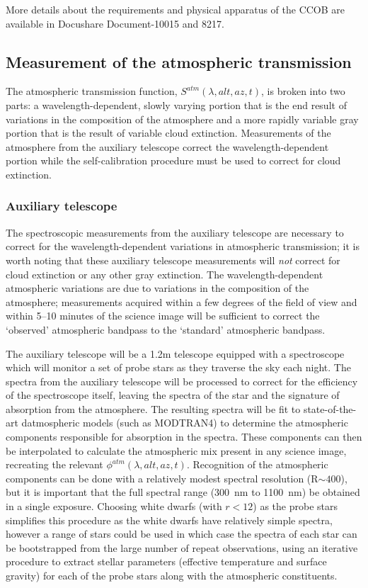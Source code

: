 \documentclass[12pt,preprint]{aastex}
\begin{document}
More details about the requirements and physical apparatus of the CCOB
are available in Docushare Document-10015 and 8217.

\subsection{Measurement of the atmospheric transmission} 

The atmospheric transmission function, $S^{atm}(\lambda,alt,az,t)$, is
broken into two parts: a wavelength-dependent, slowly varying portion
that is the end result of variations in the composition of the
atmosphere and a more rapidly variable gray portion that is the result
of variable cloud extinction. Measurements of the atmosphere from the
auxiliary telescope correct the wavelength-dependent portion while the
self-calibration procedure must be used to correct for cloud
extinction. 

\subsubsection{Auxiliary telescope}
\label{sec:auxtele}

The spectroscopic measurements from the auxiliary telescope are
necessary to correct for the wavelength-dependent variations in
atmospheric transmission; it is worth noting that these auxiliary
telescope measurements will {\it not} correct for cloud extinction or
any other gray extinction. The wavelength-dependent atmospheric
variations are due to variations in the composition of the atmosphere;
measurements acquired within a few degrees of the field of view and
within 5--10 minutes of the science image will be sufficient to
correct the `observed' atmospheric bandpass to the `standard'
atmospheric bandpass.

The auxiliary telescope will be a 1.2m telescope equipped with a
spectroscope which will monitor a set of probe stars as they traverse
the sky each night. The spectra from the auxiliary telescope will be
processed to correct for the efficiency of the spectroscope itself,
leaving the spectra of the star and the signature of absorption from
the atmosphere. The resulting spectra will be fit to state-of-the-art
datmospheric models (such as MODTRAN4) to determine the atmospheric
components responsible for absorption in the spectra. These components
can then be interpolated to calculate the atmospheric mix present in
any science image, recreating the relevant
$\phi^{atm}(\lambda,alt,az,t)$. Recognition of the atmospheric components
can be done with a relatively modest spectral resolution (R$\sim400$),
but it is important that the full spectral range (300~nm to 1100~nm)
be obtained in a single exposure. Choosing white dwarfs (with $r<12$)
as the probe stars simplifies this procedure as the white dwarfs have
relatively simple spectra, however a range of stars could be used in
which case the spectra of each star can be bootstrapped from the large
number of repeat observations, using an iterative procedure to extract
stellar parameters (effective temperature and surface gravity) for
each of the probe stars along with the atmospheric constituents. 
\end{document}
